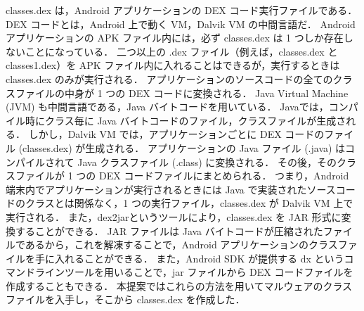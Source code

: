 classes.dex は，Android アプリケーションの DEX コード実行ファイルである．
DEX コードとは，Android 上で動く VM，Dalvik VM の中間言語だ．
Android アプリケーションの APK ファイル内には，必ず classes.dex は 1 つしか存在しないことになっている．
二つ以上の .dex ファイル（例えば，classes.dex と classes1.dex）を APK ファイル内に入れることはできるが，実行するときは classes.dex のみが実行される．
アプリケーションのソースコードの全てのクラスファイルの中身が 1 つの DEX コードに変換される．
Java Virtual Machine (JVM) も中間言語である，Java バイトコードを用いている．
Javaでは，コンパイル時にクラス毎に Java バイトコードのファイル，クラスファイルが生成される．
しかし，Dalvik VM では，アプリケーションごとに DEX コードのファイル (classes.dex) が生成される．
アプリケーションの Java ファイル (.java) はコンパイルされて Java クラスファイル (.class) に変換される．
その後，そのクラスファイルが 1 つの DEX コードファイルにまとめられる．
つまり，Android 端末内でアプリケーションが実行されるときには Java で実装されたソースコードのクラスとは関係なく，1 つの実行ファイル，classes.dex が Dalvik VM 上で実行される．
また，dex2jar\cite{d2jar}というツールにより，classes.dex を JAR 形式に変換することができる．
JAR ファイルは Java バイトコードが圧縮されたファイルであるから，これを解凍することで，Android アプリケーションのクラスファイルを手に入れることができる．
また，Android SDK が提供する dx というコマンドラインツールを用いることで，jar ファイルから DEX コードファイルを作成することもできる．
本提案ではこれらの方法を用いてマルウェアのクラスファイルを入手し，そこから classes.dex を作成した．


